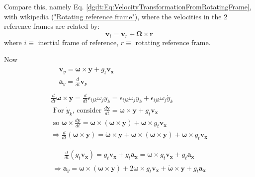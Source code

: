Compare this, namely Eq. \ref{dgdt:Eq:VelocityTransformationFromRotatingFrame}, with wikipedia (\href{https://en.wikipedia.org/wiki/Rotating_reference_frame}{"Rotating reference frame"}), where the velocities in the 2 reference frames are related by:
\begin{equation}
	\mathbf{v}_i = \mathbf{v}_r + \mathbf{\Omega} \times \mathbf{r}
\end{equation}
where $i \equiv $ inertial frame of reference, $r \equiv $ rotating reference frame.

Now
\[
\begin{gathered}
\begin{aligned}
& \mathbf{v}_y = \mathbf{\omega} \times \mathbf{y} + g_t \mathbf{v}_{\mathbf{x}} \\
& \mathbf{a}_y = \frac{d}{dt} \mathbf{v}_{\mathbf{y}} \\
\end{aligned} \\
\frac{d}{dt} \mathbf{\omega} \times \mathbf{y} = \frac{d}{dt} \epsilon_{ijk} \omega_j y_k = \epsilon_{ijk} \dot{\omega}_j y_k + \epsilon_{ijk} \omega_j \dot{y}_k  \\
\text{ For $\dot{y}_k$, consider } \frac{d\mathbf{y}}{dt} = \mathbf{\omega} \times \mathbf{y} + g_t \mathbf{v}_{\mathbf{x}} \\
\text{ so } \mathbf{\omega} \times \frac{d\mathbf{y}}{dt} = \mathbf{\omega} \times ( \mathbf{\omega} \times \mathbf{y} ) + \mathbf{\omega} \times g_t \mathbf{v}_{\mathbf{x}} \\
\Longrightarrow \frac{d}{dt} (\mathbf{\omega} \times \mathbf{y}) = \dot{\mathbf{\omega} } \times \mathbf{y} + \mathbf{\omega} \times (\mathbf{\omega} \times \mathbf{y} ) + \mathbf{\omega} \times g_t \mathbf{v}_{\mathbf{x}}
\end{gathered}
\]


\[
\begin{gathered}
\frac{d}{dt}(g_t \mathbf{v}_{\mathbf{x}} ) = \dot{g}_t \mathbf{v}_{\mathbf{x}} + g_t \mathbf{a}_{\mathbf{x}} = \mathbf{\omega} \times g_t \mathbf{v}_{\mathbf{x}} + g_t \mathbf{a}_{\mathbf{x}} \\
\end{gathered}
\]
\begin{equation}\label{dgdt:Eq:AccelerationTransformationFromRotatingFrame}
\Longrightarrow \mathbf{a}_y =   \mathbf{\omega} \times (\mathbf{\omega} \times \mathbf{y} )  + 2  \mathbf{\omega} \times g_t \mathbf{v}_{\mathbf{x}} + \dot{\mathbf{\omega} } \times \mathbf{y} + g_t \mathbf{a}_{\mathbf{x}}
\end{equation}

